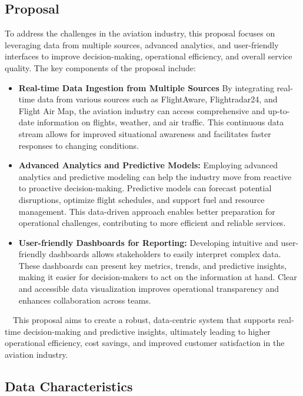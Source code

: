 \documentclass[12pt,a4paper]{article}
\begin{document}
\subsection{Proposal}
To address the challenges in the aviation industry, this proposal focuses on
leveraging data from multiple sources, advanced analytics, and user-friendly
interfaces to improve decision-making, operational efficiency, and overall
service quality. The key components of the proposal include:
    \begin{itemize}
        \item \textbf{Real-time Data Ingestion from Multiple Sources} By
        integrating real-time data from various sources such as FlightAware,
        Flightradar24, and Flight Air Map, the aviation industry can access
        comprehensive and up-to-date information on flights, weather, and air
        traffic. This continuous data stream allows for improved situational
        awareness and facilitates faster responses to changing conditions.
        \item \textbf{Advanced Analytics and Predictive Models:} Employing
        advanced analytics and predictive modeling can help the industry move
        from reactive to proactive decision-making. Predictive models can
        forecast potential disruptions, optimize flight schedules, and support
        fuel and resource management. This data-driven approach enables better
        preparation for operational challenges, contributing to more efficient
        and reliable services.
        \item \textbf{User-friendly Dashboards for Reporting:} Developing
        intuitive and user-friendly dashboards allows stakeholders to easily
        interpret complex data. These dashboards can present key metrics,
        trends, and predictive insights, making it easier for decision-makers to
        act on the information at hand. Clear and accessible data visualization
        improves operational transparency and enhances collaboration across
        teams.
    \end{itemize}
    $\quad$This proposal aims to create a robust, data-centric system that
    supports real-time decision-making and predictive insights, ultimately
    leading to higher operational efficiency, cost savings, and improved
    customer satisfaction in the aviation industry.

\subsection{Data Characteristics}
\end{document}
